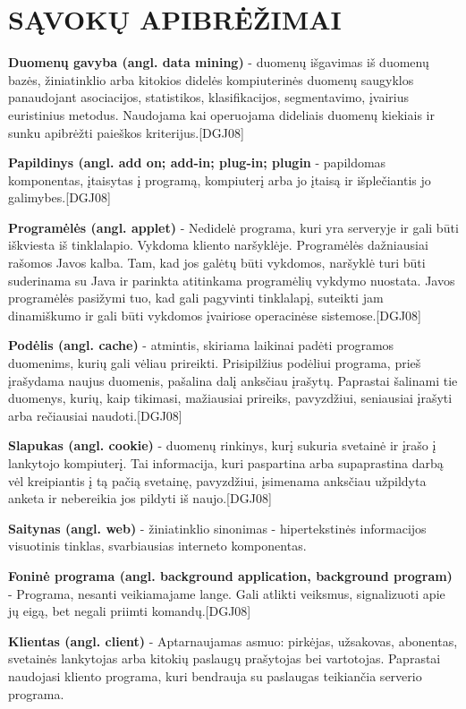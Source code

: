 \documentclass[12pt,a4paper,titlepage]{article}
\begin{document}
\section*{SĄVOKŲ APIBRĖŽIMAI}

\textbf{Duomenų gavyba (angl. data mining)} - duomenų išgavimas iš duomenų bazės, žiniatinklio arba kitokios didelės kompiuterinės duomenų saugyklos panaudojant asociacijos, statistikos, klasifikacijos, segmentavimo, įvairius euristinius metodus. Naudojama kai operuojama dideliais duomenų kiekiais ir sunku apibrėžti paieškos kriterijus.[DGJ08]

\textbf{Papildinys (angl. add on; add-in; plug-in; plugin} - papildomas komponentas, įtaisytas į programą, kompiuterį arba jo įtaisą ir išplečiantis jo galimybes.[DGJ08]

\textbf{Programėlės (angl. applet)} - Nedidelė programa, kuri yra serveryje ir gali būti iškviesta iš tinklalapio. Vykdoma kliento naršyklėje.
Programėlės dažniausiai rašomos Javos kalba. Tam, kad jos galėtų būti vykdomos, naršyklė turi būti suderinama su Java ir parinkta atitinkama programėlių vykdymo nuostata. Javos programėlės pasižymi tuo, kad gali pagyvinti tinklalapį, suteikti jam dinamiškumo ir gali būti vykdomos įvairiose operacinėse sistemose.[DGJ08]

\textbf{Podėlis (angl. cache)} - atmintis, skiriama laikinai padėti programos duomenims, kurių gali vėliau prireikti. Prisipilžius podėliui programa, prieš įrašydama naujus duomenis, pašalina dalį anksčiau įrašytų. Paprastai šalinami tie duomenys, kurių, kaip tikimasi, mažiausiai prireiks, pavyzdžiui, seniausiai įrašyti arba rečiausiai naudoti.[DGJ08]

\textbf{Slapukas (angl. cookie)} - duomenų rinkinys, kurį sukuria svetainė ir įrašo į lankytojo kompiuterį. Tai informacija, kuri paspartina arba supaprastina darbą vėl kreipiantis į tą pačią svetainę, pavyzdžiui, įsimenama anksčiau užpildyta anketa ir nebereikia jos pildyti iš naujo.[DGJ08]

\textbf{Saitynas (angl. web)} - žiniatinklio sinonimas - hipertekstinės informacijos visuotinis tinklas, svarbiausias interneto komponentas.

\textbf{Foninė programa (angl. background application, background program)} - Programa, nesanti veikiamajame lange.
Gali atlikti veiksmus, signalizuoti apie jų eigą, bet negali priimti komandų.[DGJ08]

\textbf{Klientas (angl. client)} - Aptarnaujamas asmuo: pirkėjas, užsakovas, abonentas, svetainės lankytojas arba kitokių paslaugų prašytojas bei vartotojas. Paprastai naudojasi kliento programa, kuri bendrauja su paslaugas teikiančia serverio programa.
\end{document}
